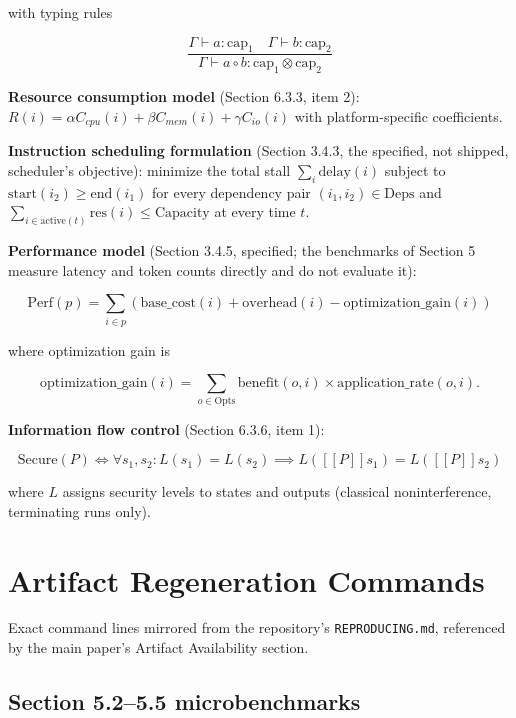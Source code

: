 \documentclass[
  11pt,
]{article}
\newcommand{\llbracket}{[\![}
\newcommand{\rrbracket}{]\!]}
\begin{document}
with typing rules

\[
\frac{\Gamma \vdash a : \text{cap}_1 \quad \Gamma \vdash b : \text{cap}_2}
     {\Gamma \vdash a \circ b : \text{cap}_1 \otimes \text{cap}_2}
\]

\textbf{Resource consumption model} (Section 6.3.3, item 2):
\(R(i) = \alpha C_{cpu}(i) + \beta C_{mem}(i) + \gamma C_{io}(i)\) with
platform-specific coefficients.

\textbf{Instruction scheduling formulation} (Section 3.4.3, the
specified, not shipped, scheduler's objective): minimize the total stall
\(\sum_i \text{delay}(i)\) subject to
\(\text{start}(i_2) \geq \text{end}(i_1)\) for every dependency pair
\((i_1, i_2) \in \text{Deps}\) and
\(\sum_{i \in \text{active}(t)} \text{res}(i) \leq \text{Capacity}\) at
every time \(t\).

\textbf{Performance model} (Section 3.4.5, specified; the benchmarks of
Section 5 measure latency and token counts directly and do not evaluate
it):

\[
\text{Perf}(p) = \sum_{i \in p} (\text{base\_cost}(i) + \text{overhead}(i) - \text{optimization\_gain}(i))
\]

where optimization gain is

\[
\text{optimization\_gain}(i) = \sum_{o \in \text{Opts}} \text{benefit}(o,i) \times \text{application\_rate}(o,i).
\]

\textbf{Information flow control} (Section 6.3.6, item 1):

\[
\text{Secure}(P) \iff \forall s_1, s_2: L(s_1) = L(s_2) \implies L(\llbracket P \rrbracket s_1) = L(\llbracket P \rrbracket s_2)
\]

where \(L\) assigns security levels to states and outputs (classical
noninterference, terminating runs only).

\section{Artifact Regeneration
Commands}\label{artifact-regeneration-commands}

Exact command lines mirrored from the repository's
\texttt{REPRODUCING.md}, referenced by the main paper's Artifact
Availability section.

\subsection{Section 5.2--5.5
microbenchmarks}\label{section-5.25.5-microbenchmarks}
\end{document}
